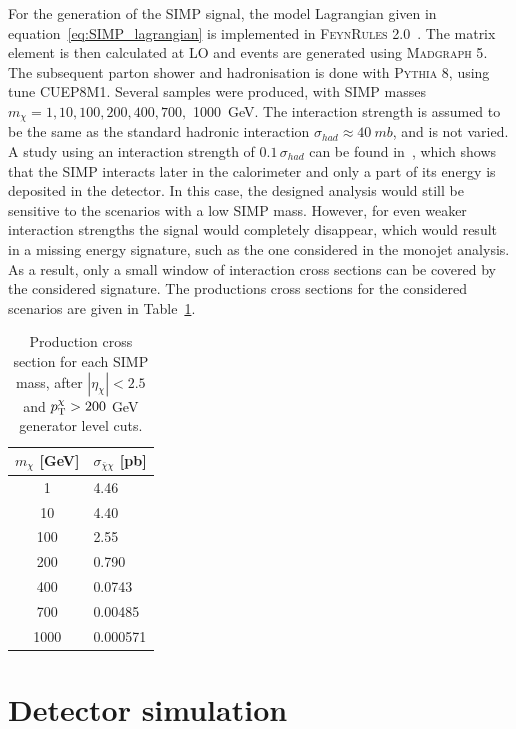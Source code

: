 For the generation of the \ac{SIMP} signal, the model Lagrangian given in equation~\ref{eq:SIMP_lagrangian} is implemented in \textsc{FeynRules 2.0}~\cite{Alloul:2013bka}. The matrix element is then calculated at \ac{LO} and events are generated using \textsc{Madgraph 5}. The subsequent parton shower and hadronisation is done with \textsc{Pythia 8}, using tune CUEP8M1. Several samples were produced, with \ac{SIMP} masses $m_{\chi} = 1, 10, 100, 200, 400, 700,$ \SI{1000}{GeV}. The interaction strength is assumed to be the same as the standard hadronic interaction $\sigma_{had} \approx \SI{40}{mb}$, and is not varied. A study using an interaction strength of $0.1\,\sigma_{had}$ can be found in~\cite{Daci:2015hca}, which shows that the \ac{SIMP} interacts later in the calorimeter and only a part of its energy is deposited in the detector. In this case, the designed analysis would still be sensitive to the scenarios with a low \ac{SIMP} mass. However, for even weaker interaction strengths the signal would completely disappear, which would result in a missing energy signature, such as the one considered in the monojet analysis. As a result, only a small window of interaction cross sections can be covered by the considered signature. The productions cross sections for the considered scenarios are given in Table~\ref{tab:signal_samples}. 

\begin{table}[ht]
  \centering
\caption{Production cross section for each \ac{SIMP} mass, after $|\eta_{\chi}| < 2.5$ and $p_{\rm T}^{\chi} > 200$ GeV generator level cuts.}
\begin{tabular}{| c | l |}
\hline
$m_\chi$ [GeV] & $\sigma_{\bar{\chi}\chi}$ [pb] \\
\hline
    1 &  4.46 \\
  10 &   4.40  \\
  100 &  2.55  \\
  200 &   0.790  \\
  400 &   0.0743   \\
  700 &   0.00485  \\
1000 &   0.000571  \\
\hline
\end{tabular}
\label{tab:signal_samples}
\end{table}

\section{Detector simulation}
\label{sec:sim}

